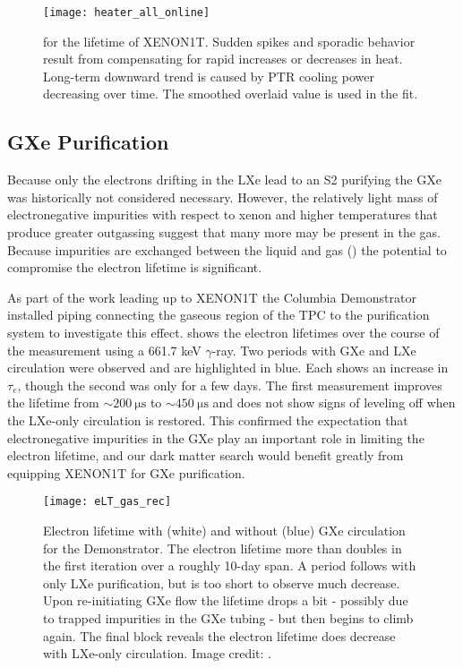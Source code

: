 \begin{figure}
\centering
\texttt{[image: heater\_all\_online]}
\caption{\qdh for the lifetime of XENON1T.  Sudden spikes and sporadic behavior result from compensating for rapid increases or decreases
in heat.  Long-term downward trend is caused by PTR cooling power decreasing over time.  The smoothed overlaid value is used in the fit.}
\label{fig:electron_lifetime_model_vap_and_cond_heater_all}
\end{figure}



\subsection{GXe Purification}
\label{subsec:electron_lifetime_model_gxe}
Because only the electrons drifting in the LXe lead to an S2 purifying the GXe was historically not considered necessary.  However,
the relatively light mass of electronegative impurities with respect to xenon and higher temperatures that produce greater outgassing
suggest that many more may be present in the gas.  Because
impurities are exchanged between the liquid and gas () the potential to compromise
the electron lifetime is significant.

As part of the work leading up to XENON1T the Columbia Demonstrator installed piping connecting the gaseous region of the TPC to the
purification system to investigate this effect.   shows the electron lifetimes over
the course of the measurement using a  661.7 keV $\gamma$-ray.  Two periods with GXe and LXe circulation were observed and
are highlighted in blue.  Each shows an increase in
$\tau_e$, though the second was only for a few days.  The first measurement improves the lifetime from
${\sim} 200\ \mathrm{\mu s}$ to ${\sim} 450\ \mathrm{\mu s}$ and does not show signs of leveling off when the LXe-only circulation is
restored.  This confirmed the expectation that electronegative impurities in the GXe play an important role in limiting the electron
lifetime, and our dark matter search would benefit greatly from equipping XENON1T for GXe purification.

\begin{figure}
\centering
\texttt{[image: eLT\_gas\_rec]}
\caption{Electron lifetime with (white) and without (blue) GXe circulation for the Demonstrator.  The electron lifetime more than doubles
in the first iteration over a roughly 10-day span.  A period follows with
only LXe purification, but is too short to observe much decrease.  Upon re-initiating GXe flow the lifetime drops a bit - possibly due to
trapped impurities in the GXe tubing - but then begins to climb again.  The final block reveals the electron lifetime does
decrease with LXe-only circulation.  Image credit: .}
\label{fig:electron_lifetime_model_gxe_demonstrator}
\end{figure}

